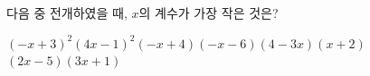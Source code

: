 다음 중 전개하였을 때, $x$의 계수가 가장 작은 것은?
\begin{choicesii}{$(-x+3)^2$}{$(4x-1)^2$}{$(-x+4)(-x-6)$}{$(4-3x)(x+2)$}{$(2x-5)(3x+1)$}\end{choicesii}
